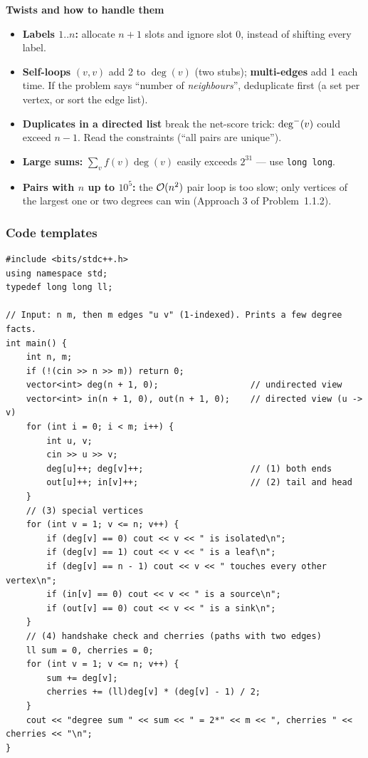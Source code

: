 \textbf{Twists and how to handle them}
\begin{itemize}[leftmargin=*]
    \item \textbf{Labels $1..n$:} allocate $n+1$ slots and ignore slot 0, instead of shifting every label.
    \item \textbf{Self-loops} $(v,v)$ add 2 to $\deg(v)$ (two stubs); \textbf{multi-edges} add 1 each time. If the problem says ``number of \emph{neighbours}'', deduplicate first (a set per vertex, or sort the edge list).
    \item \textbf{Duplicates in a directed list} break the net-score trick: $\deg^{-}(v)$ could exceed $n-1$. Read the constraints (``all pairs are unique'').
    \item \textbf{Large sums:} $\sum_v f(v)\deg(v)$ easily exceeds $2^{31}$ --- use \texttt{long long}.
    \item \textbf{Pairs with $n$ up to $10^5$:} the $\mathcal{O}(n^2)$ pair loop is too slow; only vertices of the largest one or two degrees can win (Approach 3 of Problem~1.1.2).
\end{itemize}

\subsubsection*{Code templates}

\begin{lstlisting}[style=cpp]
#include <bits/stdc++.h>
using namespace std;
typedef long long ll;

// Input: n m, then m edges "u v" (1-indexed). Prints a few degree facts.
int main() {
    int n, m;
    if (!(cin >> n >> m)) return 0;
    vector<int> deg(n + 1, 0);                  // undirected view
    vector<int> in(n + 1, 0), out(n + 1, 0);    // directed view (u -> v)
    for (int i = 0; i < m; i++) {
        int u, v;
        cin >> u >> v;
        deg[u]++; deg[v]++;                     // (1) both ends
        out[u]++; in[v]++;                      // (2) tail and head
    }
    // (3) special vertices
    for (int v = 1; v <= n; v++) {
        if (deg[v] == 0) cout << v << " is isolated\n";
        if (deg[v] == 1) cout << v << " is a leaf\n";
        if (deg[v] == n - 1) cout << v << " touches every other vertex\n";
        if (in[v] == 0) cout << v << " is a source\n";
        if (out[v] == 0) cout << v << " is a sink\n";
    }
    // (4) handshake check and cherries (paths with two edges)
    ll sum = 0, cherries = 0;
    for (int v = 1; v <= n; v++) {
        sum += deg[v];
        cherries += (ll)deg[v] * (deg[v] - 1) / 2;
    }
    cout << "degree sum " << sum << " = 2*" << m << ", cherries " << cherries << "\n";
}
\end{lstlisting}

